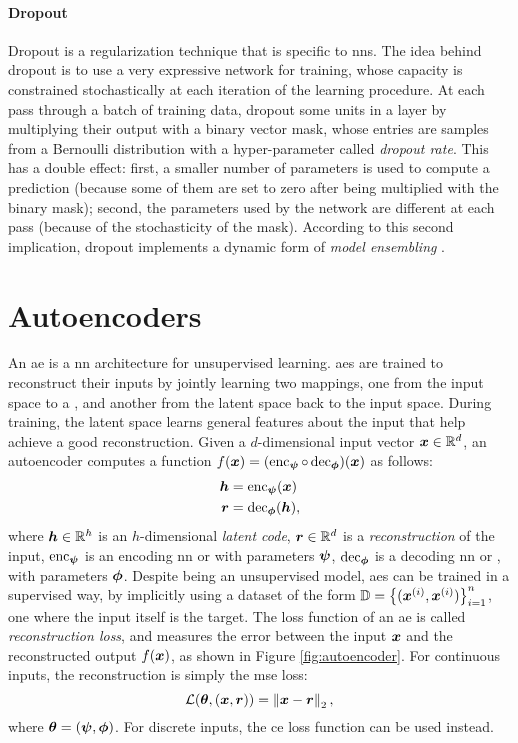 \paragraph{Dropout}
Dropout \citep{srivastava2014dropout} is a regularization technique that is specific to \glspl{nn}. The idea behind dropout is to use a very expressive network for training, whose capacity is constrained stochastically at each iteration of the learning procedure. At each pass through a batch of training data, dropout  some units in a layer by multiplying their output with a binary vector mask, whose entries are samples from a Bernoulli distribution with a hyper-parameter called \emph{dropout rate}. This has a double effect: first, a smaller number of parameters is used to compute a prediction (because some of them are set to zero after being multiplied with the binary mask); second, the parameters used by the network are different at each pass (because of the stochasticity of the mask). According to this second implication, dropout implements a dynamic form of \emph{model ensembling} \citep{ghahramani2016dropout}.

\section{Autoencoders}\label{sec:autoencoders}
An \gls{ae} \citep{baldi2012autoenc} is a \gls{nn} architecture for unsupervised learning. \glspl{ae} are trained to reconstruct their inputs by jointly learning two mappings, one from the input space to a , and another from the latent space back to the input space. During training, the latent space learns general features about the input that help achieve a good reconstruction. Given a $d$-dimensional input vector $\Vector{x} \in \Real^d$, an autoencoder computes a function $f(\Vector{x}) = (\EncoderNet \circ \DecoderNet)(\Vector{x})$ as follows:
\begin{align*}
    \Vector{h} &= \EncoderNet(\Vector{x})\\
    \Vector{r} &= \DecoderNet(\Vector{h}),
\end{align*}
where $\Vector{h} \in \Real^h$ is an $h$-dimensional \emph{latent code}, $\Vector{r} \in \Real^d$ is a \emph{reconstruction} of the input, $\operatorname{enc}_{\boldsymbol{\psi}}$ is an encoding \gls{nn} or  with parameters $\boldsymbol{\psi}$, $\operatorname{dec}_{\boldsymbol{\phi}}$ is a decoding \gls{nn} or , with parameters $\boldsymbol{\phi}$. Despite being an unsupervised model, \glspl{ae} can be trained in a supervised way, by implicitly using a dataset of the form $\Data = \Set{(\PatternVector{x}{i}, \PatternVector{x}{i})}_{i=1}^n$, \ie one where the input itself is the target. The loss function of an \gls{ae} is called \emph{reconstruction loss}, and measures the error between the input $\Vector{x}$ and the reconstructed output $f(\Vector{x})$, as shown in Figure \ref{fig:autoencoder}. For continuous inputs, the reconstruction is simply the \gls{mse} loss:
$$\Loss(\Param, (\Vector{x}, \Vector{r})) = \Norm{\Vector{x}-\Vector{r}}_2,$$
where $\boldsymbol{\theta} = (\boldsymbol{\psi}, \boldsymbol{\phi})$. For discrete inputs, the \gls{ce} loss function can be used instead.

